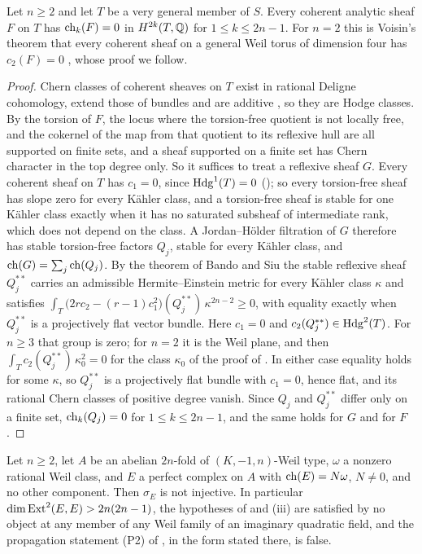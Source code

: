 \begin{proposition}
\label{prop:weiltorussheaves}
Let $n\ge2$ and let $T$ be a very general member of $S$. Every coherent
analytic sheaf $F$ on $T$ has $\operatorname{ch}_{k}(F)=0$ in $H^{2k}(T,\mathbb{Q})$ for
$1\le k\le2n-1$. For $n=2$ this is Voisin's theorem that every coherent sheaf
on a general Weil torus of dimension four has $c_{2}(F)=0$
\cite[Theorem~10]{Voi02b}, whose proof we follow.
\end{proposition}

\begin{proof}
Chern classes of coherent sheaves on $T$ exist in rational Deligne
cohomology, extend those of bundles and are additive \cite{Gri10}, so they
are Hodge classes. By  the torsion of $F$, the locus where the
torsion-free quotient is not locally free, and the cokernel of the map from
that quotient to its reflexive hull are all supported on finite sets, and a
sheaf supported on a finite set has Chern character in the top degree only. So
it suffices to treat a reflexive sheaf $G$. Every coherent sheaf on $T$ has
$c_{1}=0$, since $\mathrm{Hdg}^{1}(T)=0$ (); so every
torsion-free sheaf has slope zero for every K\"ahler class, and a torsion-free
sheaf is stable for one K\"ahler class exactly when it has no saturated
subsheaf of intermediate rank, which does not depend on the class. A
Jordan--H\"older filtration of $G$ therefore has stable torsion-free factors
$Q_{j}$, stable for every K\"ahler class, and $\operatorname{ch}(G)=\sum_{j}\operatorname{ch}(Q_{j})$.
By the theorem of Bando and Siu \cite{BS94} the stable reflexive sheaf
$Q_{j}^{**}$ carries an admissible Hermite--Einstein metric for every K\"ahler
class $\kappa$ and satisfies
$\int_{T}\bigl(2rc_{2}-(r-1)c_{1}^{2}\bigr)(Q_{j}^{**})\,\kappa^{2n-2}\ge0$,
with equality exactly when $Q_{j}^{**}$ is a projectively flat vector bundle.
Here $c_{1}=0$ and $c_{2}(Q_{j}^{**})\in\mathrm{Hdg}^{2}(T)$. For $n\ge3$ that group is
zero; for $n=2$ it is the Weil plane, and then
$\int_{T}c_{2}(Q_{j}^{**})\,\kappa_{0}^{2}=0$ for the class $\kappa_{0}$ of
the proof of . In either case equality holds for
some $\kappa$, so $Q_{j}^{**}$ is a projectively flat bundle with $c_{1}=0$,
hence flat, and its rational Chern classes of positive degree vanish. Since
$Q_{j}$ and $Q_{j}^{**}$ differ only on a finite set, $\operatorname{ch}_{k}(Q_{j})=0$ for
$1\le k\le2n-1$, and the same holds for $G$ and for $F$.
\end{proof}

\begin{theorem}
\label{thm:p2false}
Let $n\ge2$, let $A$ be an abelian $2n$-fold of $(K,-1,n)$-Weil type, $\omega$
a nonzero rational Weil class, and $E$ a perfect complex on $A$ with
$\operatorname{ch}(E)=N\omega$, $N\ne0$, and no other component. Then $\sigma_{E}$ is not
injective. In particular $\dim\operatorname{Ext}^{2}(E,E)>2n(2n-1)$, the hypotheses of
 and (iii) are satisfied by no
object at any member of any Weil family of an imaginary quadratic field, and
the propagation statement \textup{(P2)} of , in the form
stated there, is false.
\end{theorem}

